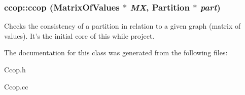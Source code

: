 \subsubsection{\setlength{\rightskip}{0pt plus 5cm}ccop::ccop ({\bf Matrix\-Of\-Values} $\ast$ {\em MX}, {\bf Partition} $\ast$ {\em part})}\label{classccop_a0}


Checks the consistency of a partition in relation to a given graph (matrix of values). It's the initial core of this while project. 

The documentation for this class was generated from the following files:\begin{CompactItemize}
\item 
Ccop.h\item 
Ccop.cc\end{CompactItemize}
